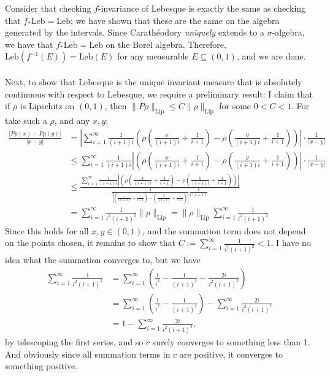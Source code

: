 \documentclass[10pt,a4paper]{article}
\begin{document}
Consider that checking $f$-invariance of Lebesque is exactly the same as checking that $f_*\text{Leb}=\text{Leb}$; we have shown that these are the same on the algebra generated by the intervals. Since Carath\'eodory \textit{uniquely} extends to a $\sigma$-algebra, we have that $f_*\text{Leb}=\text{Leb}$ on the Borel algebra. Therefore, $\text{Leb}(f^{-1}(E))=\text{Leb}(E)$ for any measurable $E\subseteq(0,1)$, and we are done.\\\\
Next, to show that Lebesque is the unique invariant measure that is absolutely continuous with respect to Lebesque, we require a preliminary result: I claim that if $\rho$ is Lipschitz on $(0,1)$, then $\|P\rho\|_{\text{Lip}}\leq C\|\rho\|_{\text{Lip}}$ for some $0<C<1$. For take such a $\rho$, and any $x,y$:
\begin{align*}\frac{|P\rho(x)-P\rho(y)|}{|x-y|}&=\left|\sum_{i=1}^\infty \frac{1}{(i+1)i}\left(\rho\left(\frac{x}{(i+1)i}+\frac{1}{i+1}\right)-\rho\left(\frac{y}{(i+1)i}+\frac{1}{i+1}\right)\right)\right|\cdot\frac{1}{|x-y|}\\
&\leq \sum_{i=1}^\infty \frac{1}{(i+1)i}\left|\left(\rho\left(\frac{x}{(i+1)i}+\frac{1}{i+1}\right)-\rho\left(\frac{y}{(i+1)i}+\frac{1}{i+1}\right)\right)\right|\cdot\frac{1}{|x-y|}\\
&\leq \frac{\sum_{i=1}^\infty \frac{1}{(i+1)i}\left|\left(\rho\left(\frac{x}{(i+1)i}+\frac{1}{i+1}\right)-\rho\left(\frac{y}{(i+1)i}+\frac{1}{i+1}\right)\right)\right|}{\frac{1}{|\left(\frac{x}{i(i+1)}+\frac{1}{i+1}\right)-\left(\frac{y}{i(i+1)}+\frac{1}{i+1}\right)|}\frac{1}{i(i+1)}}\\
&= \sum_{i=1}^\infty\frac{1}{i^2(i+1)^2}\|\rho\|_{\text{Lip}}= \|\rho\|_{\text{Lip}}\sum_{i=1}^\infty\frac{1}{i^2(i+1)^2}\end{align*}
Since this holds for all $x,y\in(0,1)$, and the summation term does not depend on the points chosen, it remains to show that $\displaystyle C:=\sum_{i=1}^\infty\frac{1}{i^2(i+1)^2}<1$. I have no idea what the summation converges to, but we have
\begin{align*}\sum_{i=1}^\infty\frac{1}{i^2(i+1)^2}&=\sum_{i=1}^\infty\left(\frac{1}{i^2}-\frac{1}{(i+1)^2}-\frac{2i}{i^2(i+1)^2}\right)\\&=\sum_{i=1}^\infty\left(\frac{1}{i^2}-\frac{1}{(i+1)^2}\right)-\sum_{i=1}^\infty\frac{2i}{i^2(i+1)^2}\\&=1-\sum_{i=1}^\infty\frac{2i}{i^2(i+1)^2},\end{align*}
by telescoping the first series, and so $c$ surely converges to something less than 1. And obviously since all summation terms in $c$ are positive, it converges to something positive.\\\\
\end{document}
